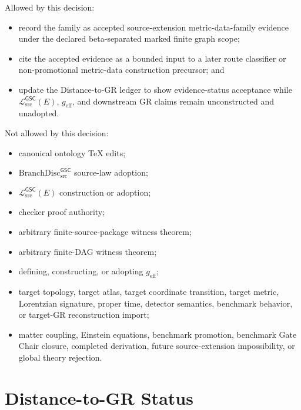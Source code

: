 \documentclass[11pt]{article}
\newcommand{\BranchDisc}{\mathrm{BranchDisc}_{\mathrm{src}}^{\mathsf{GSC}}}
\newcommand{\MetricData}{\mathcal{L}_{\mathrm{src}}^{\mathsf{GSC}}}
\newcommand{\geff}{g_{\mathrm{eff}}}
\begin{document}
Allowed by this decision:
\begin{itemize}[leftmargin=*]
  \item record the family as accepted source-extension metric-data-family
  evidence under the declared beta-separated marked finite graph scope;
  \item cite the accepted evidence as a bounded input to a later route
  classifier or non-promotional metric-data construction precursor; and
  \item update the Distance-to-GR ledger to show evidence-status acceptance
  while \(\MetricData(E)\), \(\geff\), and downstream GR claims remain
  unconstructed and unadopted.
\end{itemize}

Not allowed by this decision:
\begin{itemize}[leftmargin=*]
  \item canonical ontology TeX edits;
  \item \(\BranchDisc\) source-law adoption;
  \item \(\MetricData(E)\) construction or adoption;
  \item checker proof authority;
  \item arbitrary finite-source-package witness theorem;
  \item arbitrary finite-DAG witness theorem;
  \item defining, constructing, or adopting \(\geff\);
  \item target topology, target atlas, target coordinate transition, target
  metric, Lorentzian signature, proper time, detector semantics, benchmark
  behavior, or target-GR reconstruction import;
  \item matter coupling, Einstein equations, benchmark promotion, benchmark
  Gate Chair closure, completed derivation, future source-extension
  impossibility, or global theory rejection.
\end{itemize}

\section{Distance-to-GR Status}
\end{document}
